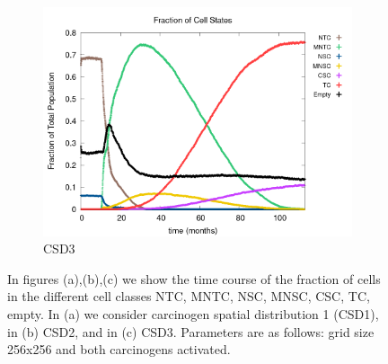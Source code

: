 \documentclass[\main/thesis.tex]{subfiles}
\begin{document}
\begin{figure}[H]
\begin{subfigure}[t]{.6\textwidth}
      \centering
      \includegraphics[width=\textwidth]{images/4_CarcinFunc/Fig2/numState_all_Func3.png}
      \caption{CSD3}
      \label{fig:CarcinFunc_numState_Func3}
    \end{subfigure}
    \caption{In figures (a),(b),(c) we show the time course of the fraction of cells in the different cell classes NTC, MNTC, NSC, MNSC, CSC, TC, empty. In (a) we consider carcinogen spatial distribution 1 (CSD1), in (b) CSD2, and in (c) CSD3. Parameters are as follows: grid size 256x256 and both carcinogens activated.}
    \label{fig:CarcinFunc_numState}
\end{figure}
\end{document}

